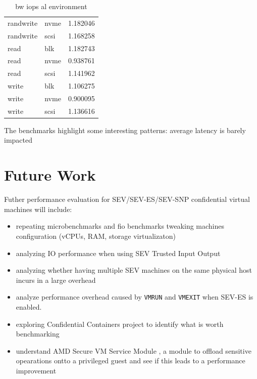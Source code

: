 \documentclass[twocolumn]{article}
\begin{document}
\begin{table}
\begin{tabular}{llr}
        randwrite & nvme & 1.182046 \\
        randwrite & scsi & 1.168258 \\
        read & blk & 1.182743 \\
        read & nvme & 0.938761 \\
        read & scsi & 1.141962 \\
        write & blk & 1.106275 \\
        write & nvme & 0.900095 \\
        write & scsi & 1.136616 \\
        \hline
    \end{tabular}
    \caption{bw iops al environment}
\end{table}




The benchmarks highlight some interesting patterns: average latency is barely impacted

\section{Future Work}
Futher performance evaluation for SEV/SEV-ES/SEV-SNP confidential virtual machines will include:

\begin{itemize}
    \item repeating microbenchmarks and fio benchmarks tweaking machines configuration (vCPUs, RAM, storage virtualizaton)
    \item analyzing IO performance when using SEV Trusted Input Output \cite{tio}
    \item analyzing whether having multiple SEV machines on the same physical host incurs in a large overhead
    \item analyze performance overhead caused by \texttt{VMRUN} and \texttt{VMEXIT} when SEV-ES is enabled.
    \item exploring Confidential Containers \cite{coco} project to identify what is worth benchmarking
    \item understand AMD Secure VM Service Module \cite{svsm}, a module to offload sensitive opearations ontto a privileged guest and see if this leads to a performance improvement
\end{itemize}
\end{document}
